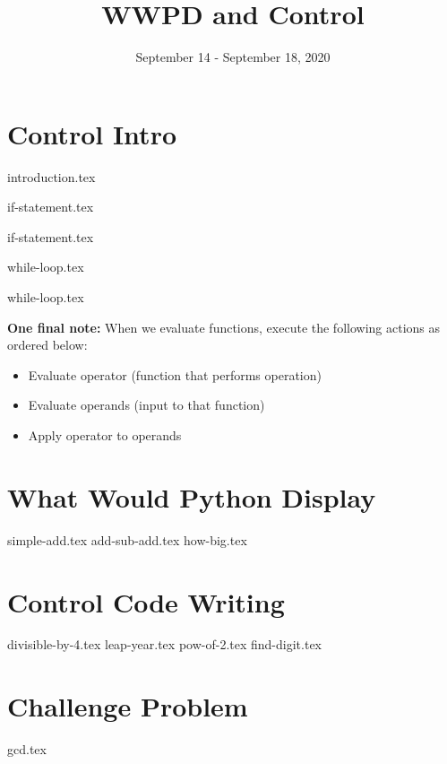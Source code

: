 \documentclass{exam}
\title{WWPD and Control}
\date{September 14 - September 18, 2020}
\begin{document}
\maketitle
\section{Control Intro}
{introduction.tex}


{if-statement.tex}

{if-statement.tex}

{while-loop.tex}

{while-loop.tex}

\vspace{5}                                                                                                                                                                                                                                   
\textbf{One final note: } When we evaluate functions, execute the following actions as ordered below:
\begin{itemize}
  \item Evaluate operator (function that performs operation)
  \item Evaluate operands (input to that function)
  \item Apply operator to operands
\end{itemize}


\section{What Would Python Display}
\begin{questions}
{simple-add.tex}
{add-sub-add.tex}
{how-big.tex}

\end{questions}
\newpage
\section{Control Code Writing}
\begin{questions}
{divisible-by-4.tex}
{leap-year.tex}
{pow-of-2.tex}
{find-digit.tex}
\end{questions}

\newpage
\section{Challenge Problem}
\begin{questions}
{gcd.tex}
\end{questions}
\end{document}
